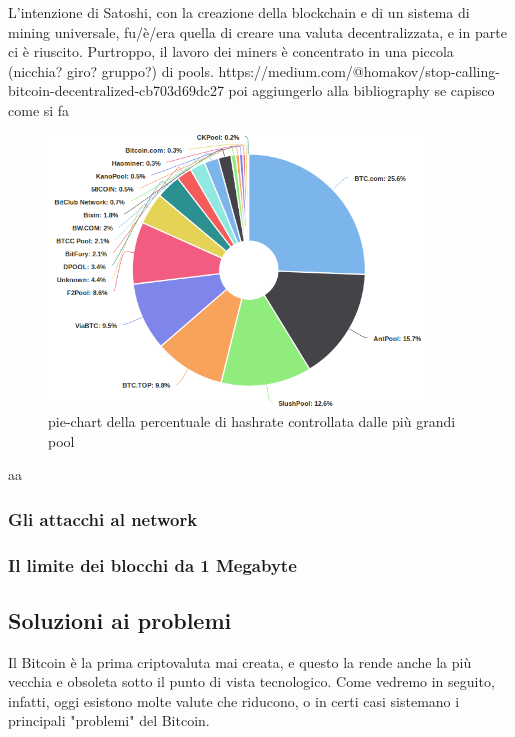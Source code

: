 \documentclass {article}
\begin{document}
L'intenzione di Satoshi, con la creazione della blockchain e di un sistema di mining universale, fu/è/era quella di creare una valuta decentralizzata, e in parte ci è riuscito.
Purtroppo, il lavoro dei miners è concentrato in una piccola (nicchia? giro? gruppo?) di pools.
https://medium.com/@homakov/stop-calling-bitcoin-decentralized-cb703d69dc27 poi aggiungerlo alla bibliography se capisco come si fa

\vspace {0.5cm}
\begin{figure}[h]
\includegraphics [width = 10cm] {pools.png}
\centering
\caption {pie-chart della percentuale di hashrate controllata dalle più grandi pool}
\end{figure}
\vspace {0.2cm}
\noindent
%
aa


\subsubsection {Gli attacchi al network} %


\subsubsection {Il limite dei blocchi da 1 Megabyte}



\subsection {Soluzioni ai problemi}


Il Bitcoin è la prima criptovaluta mai creata, e questo la rende anche la più vecchia e obsoleta sotto il punto di vista tecnologico. Come vedremo in seguito, infatti, oggi esistono molte valute che riducono, o in certi casi sistemano i principali "problemi" del Bitcoin.
\end{document}
